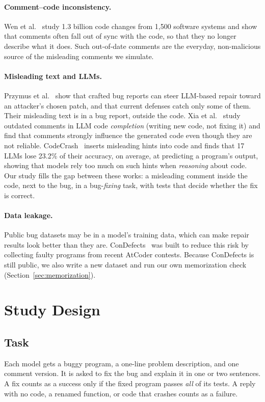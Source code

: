 \documentclass[sigconf,nonacm]{acmart}
\newcommand{\cd}{ConDefects}
\begin{document}
\paragraph{Comment--code inconsistency.}
Wen et al.~\cite{wen2019inconsistencies} study 1.3 billion code changes from 1,500 software systems and show that comments often fall out of sync with the code, so that they no longer describe what it does. Such out-of-date comments are the everyday, non-malicious source of the misleading comments we simulate.

\paragraph{Misleading text and LLMs.}
Przymus et al.~\cite{przymus2026adversarial} show that crafted bug reports can steer LLM-based repair toward an attacker's chosen patch, and that current defenses catch only some of them. Their misleading text is in a bug report, outside the code. Xia et al.~\cite{xia2026outdated} study outdated comments in LLM code \emph{completion} (writing new code, not fixing it) and find that comments strongly influence the generated code even though they are not reliable. CodeCrash~\cite{lam2025codecrash} inserts misleading hints into code and finds that 17 LLMs lose 23.2\% of their accuracy, on average, at predicting a program's output, showing that models rely too much on such hints when \emph{reasoning} about code. Our study fills the gap between these works: a misleading comment inside the code, next to the bug, in a bug-\emph{fixing} task, with tests that decide whether the fix is correct.

\paragraph{Data leakage.}
Public bug datasets may be in a model's training data, which can make repair results look better than they are. \cd{}~\cite{wu2024condefects} was built to reduce this risk by collecting faulty programs from recent AtCoder contests. Because \cd{} is still public, we also write a new dataset and run our own memorization check (Section~\ref{sec:memorization}).

\section{Study Design}
\label{sec:design}

\subsection{Task}
Each model gets a buggy program, a one-line problem description, and one comment version. It is asked to fix the bug and explain it in one or two sentences. A fix counts as a success only if the fixed program passes \emph{all} of its tests. A reply with no code, a renamed function, or code that crashes counts as a failure.
\end{document}
